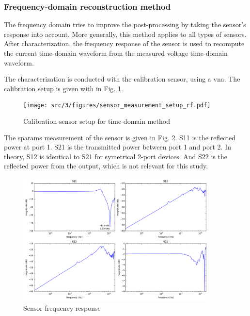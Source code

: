 \subsubsection{Frequency-domain reconstruction method}
The frequency domain tries to improve the post-processing by taking the sensor's response into account.
More generally, this method applies to all types of sensors.
After characterization, the frequency response of the sensor is used to recompute the current time-domain waveform from the measured voltage time-domain waveform.

The characterization is conducted with the calibration sensor, using a \gls{vna}.
The calibration setup is given with in Fig. \ref{fig:calibration-sensor-rf}.

\begin{figure}[!h]
  \centering
  \texttt{[image: src/3/figures/sensor\_measurement\_setup\_rf.pdf]}
  \caption{Calibration sensor setup for time-domain method}
  \label{fig:calibration-sensor-rf}
\end{figure}

The \gls{sparams} measurement of the sensor is given in Fig. \ref{fig:sensor-response}.
S11 is the reflected power at port 1.
S21 is the transmitted power between port 1 and port 2.
In theory, S12 is identical to S21 for symetrical 2-port devices.
And S22 is the reflected power from the output, which is not relevant for this study.

\begin{figure}[!h]
  \centering
  \includegraphics[width=0.9\textwidth]{src/3/figures/sensor_freq_response.png}
  \caption{Sensor frequency response}
  \label{fig:sensor-response}
\end{figure}

